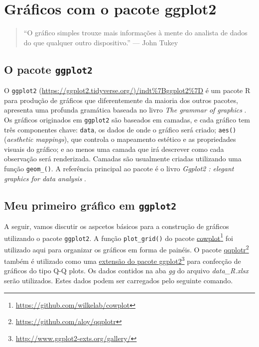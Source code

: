 \documentclass[
]{book}
\begin{document}
\hypertarget{graph}{%
\chapter{Gráficos com o pacote ggplot2}\label{graph}}

\begin{quote}
``O gráfico simples trouxe mais informações à mente do analista de dados
do que qualquer outro dispositivo.'' --- John Tukey
\end{quote}

\hypertarget{o-pacote-ggplot2}{%
\section{\texorpdfstring{O pacote \texttt{ggplot2}}{O pacote ggplot2}}\label{o-pacote-ggplot2}}

O \texttt{ggplot2} (\url{https://ggplot2.tidyverse.org/)/indt\%7Bggplot2\%7D} é um pacote R para produção de gráficos que diferentemente da maioria dos outros pacotes, apresenta uma profunda gramática baseada no livro \emph{The grammar of graphics} \citep{Wilkinson2005}. Os gráficos originados em \texttt{ggplot2} são baseados em camadas, e cada gráfico tem três componentes chave: \texttt{data}, os dados de onde o gráfico será criado; \texttt{aes()} (\emph{aesthetic mappings}), que controla o mapeamento estético e as propriedades visuais do gráfico; e ao menos uma camada que irá descrever como cada observação será renderizada. Camadas são usualmente criadas utilizando uma função \texttt{geom\_()}. A referência principal ao pacote é o livro \emph{Ggplot2 : elegant graphics for data analysis} \citep{Wickham2009}.

\hypertarget{meu-primeiro-gruxe1fico-em-ggplot2}{%
\section{\texorpdfstring{Meu primeiro gráfico em \texttt{ggplot2}}{Meu primeiro gráfico em ggplot2}}\label{meu-primeiro-gruxe1fico-em-ggplot2}}

A seguir, vamos discutir os aspcetos básicos para a construção de gráficos utilizando o pacote \texttt{ggplot2}. A função \texttt{plot\_grid()} do pacote \href{https://github.com/wilkelab/cowplot}{cowplot}\footnote{\url{https://github.com/wilkelab/cowplot}} foi utilizado aqui para organizar os gráficos em forma de painéis. O pacote \href{https://github.com/aloy/qqplotr}{qqplotr}\footnote{\url{https://github.com/aloy/qqplotr}} também é utilizado como uma \href{http://www.ggplot2-exts.org/gallery/}{extensão do pacote ggplot2}\footnote{\url{http://www.ggplot2-exts.org/gallery/}} para confecção de gráficos do tipo Q-Q plots. Os dados contidos na aba \emph{gg} do arquivo \emph{data\_R.xlsx} serão utilizados. Estes dados podem ser carregados pelo seguinte comando.
\end{document}
